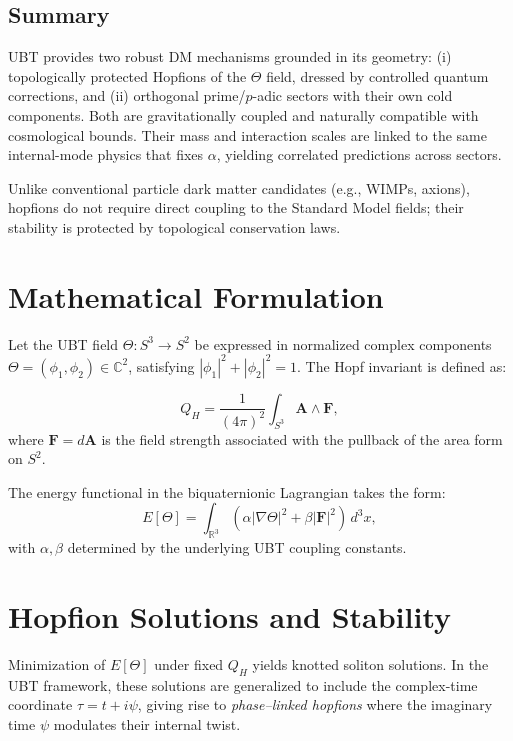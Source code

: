\documentclass[12pt,a4paper]{article}
\numberwithin{equation}{section}
\theoremstyle{definition}
\theoremstyle{remark}
\begin{document}
\subsection{Summary}
UBT provides two robust DM mechanisms grounded in its geometry: (i) topologically protected Hopfions of the $\Theta$ field, dressed by controlled quantum corrections, and (ii) orthogonal prime/$p$-adic sectors with their own cold components.
Both are gravitationally coupled and naturally compatible with cosmological bounds. Their mass and interaction scales are linked to the same internal-mode physics that fixes $\alpha$, yielding correlated predictions across sectors.


Unlike conventional particle dark matter candidates (e.g., WIMPs, axions), hopfions do not require direct coupling to the Standard Model fields; their stability is protected by topological conservation laws.

\section*{Mathematical Formulation}
Let the UBT field \(\Theta: S^3 \to S^2\) be expressed in normalized complex components \(\Theta = (\phi_1, \phi_2) \in \mathbb{C}^2\), satisfying \(|\phi_1|^2 + |\phi_2|^2 = 1\). The Hopf invariant is defined as:

\begin{equation}
Q_H = \frac{1}{(4\pi)^2} \int_{S^3} \mathbf{A} \wedge \mathbf{F},
\end{equation}
where \(\mathbf{F} = d\mathbf{A}\) is the field strength associated with the pullback of the area form on \(S^2\).

The energy functional in the biquaternionic Lagrangian takes the form:
\begin{equation}
E[\Theta] = \int_{\mathbb{R}^3} \left( \alpha |\nabla \Theta|^2 + \beta |\mathbf{F}|^2 \right) \, d^3x,
\end{equation}
with \(\alpha, \beta\) determined by the underlying UBT coupling constants.

\section*{Hopfion Solutions and Stability}
Minimization of \(E[\Theta]\) under fixed \(Q_H\) yields knotted soliton solutions. In the UBT framework, these solutions are generalized to include the complex-time coordinate \(\tau = t + i\psi\), giving rise to \emph{phase–linked hopfions} where the imaginary time \(\psi\) modulates their internal twist.
\end{document}
